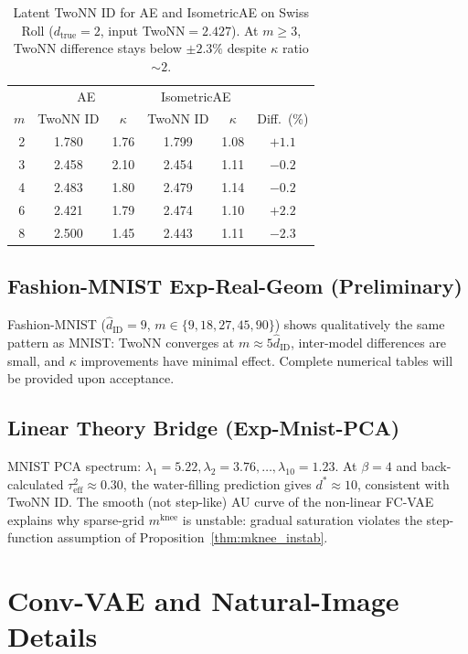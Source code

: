 \documentclass[11pt,a4paper]{article}
\newcommand{\kap}{\kappa}
\newcommand{\mknee}{m^{\mathrm{knee}}}
\newcommand{\hatdID}{\hat{d}_{\mathrm{ID}}}
\begin{document}
\begin{table}[H]
\centering
\caption{Latent TwoNN ID for AE and IsometricAE on Swiss Roll
($d_{\mathrm{true}}=2$, input TwoNN$=2.427$).
At $m\geq3$, TwoNN difference stays below $\pm2.3\%$ despite $\kap$ ratio $\sim2$.}
\label{tab:iso_id}
\small
\begin{tabular}{r cc | cc | c}
\toprule
 & \multicolumn{2}{c|}{AE} & \multicolumn{2}{c|}{IsometricAE} & \\
$m$ & TwoNN ID & $\kap$ & TwoNN ID & $\kap$ & Diff.\ (\%) \\
\midrule
2 & 1.780 & 1.76 & 1.799 & 1.08 & $+1.1$ \\
3 & 2.458 & 2.10 & 2.454 & 1.11 & $-0.2$ \\
4 & 2.483 & 1.80 & 2.479 & 1.14 & $-0.2$ \\
6 & 2.421 & 1.79 & 2.474 & 1.10 & $+2.2$ \\
8 & 2.500 & 1.45 & 2.443 & 1.11 & $-2.3$ \\
\bottomrule
\end{tabular}
\end{table}

\subsection{Fashion-MNIST Exp-Real-Geom (Preliminary)}

Fashion-MNIST ($\hatdID=9$, $m\in\{9,18,27,45,90\}$) shows qualitatively the
same pattern as MNIST: TwoNN converges at $m\approx5\hatdID$, inter-model
differences are small, and $\kap$ improvements have minimal effect.
Complete numerical tables will be provided upon acceptance.

\subsection{Linear Theory Bridge (Exp-Mnist-PCA)}

MNIST PCA spectrum: $\lambda_1=5.22, \lambda_2=3.76,\ldots,\lambda_{10}=1.23$.
At $\beta=4$ and back-calculated $\tau^2_{\mathrm{eff}}\approx0.30$, the
water-filling prediction gives $d^*\approx10$, consistent with TwoNN ID.
The smooth (not step-like) AU curve of the non-linear FC-VAE explains why
sparse-grid $\mknee$ is unstable: gradual saturation violates the
step-function assumption of Proposition~\ref{thm:mknee_instab}.

\section{Conv-VAE and Natural-Image Details}\label{app:convvae_natimg}
\end{document}
